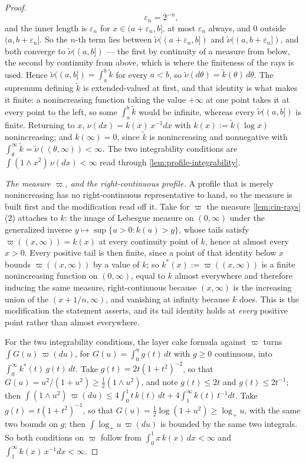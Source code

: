 \begin{proof}
\[  \qquad \varepsilon_n = 2^{-n},
\]
and the inner length is $\varepsilon_n$ for $x \in (a+\varepsilon_n, b]$, at most
$\varepsilon_n$ always, and $0$ outside $(a, b+\varepsilon_n]$. So the $n$-th term lies between
$\tilde\nu((a+\varepsilon_n, b])$ and $\tilde\nu((a, b+\varepsilon_n])$, and both converge to
$\tilde\nu((a,b])$ --- the first by continuity of a measure from below, the second by continuity
from above, which is where the finiteness of the rays is used. Hence
$\tilde\nu((a,b]) = \int_a^b \tilde k$ for every $a < b$, so $\tilde\nu(d\theta) =
\tilde k(\theta)\,d\theta$. The supremum defining $\tilde k$ is extended-valued at first, and
that identity is what makes it finite: a nonincreasing function taking the value $+\infty$ at
one point takes it at every point to the left, so some $\int_a^b \tilde k$ would be infinite,
whereas every $\tilde\nu((a,b])$ is finite. Returning to $x$, $\nu(dx) = k(x)\,x^{-1}dx$ with
$k(x) := \tilde k(\log x)$ nonincreasing; and $k(\infty) = 0$, since $\tilde k$ is nonincreasing
and nonnegative with $\int_\theta^\infty \tilde k = \tilde\nu((\theta,\infty)) < \infty$. The two
integrability
conditions are $\int (1 \wedge x^2)\,\nu(dx) < \infty$ read through
\ref{lem:profile-integrability}.

\emph{The measure $\varpi$, and the right-continuous profile.} A profile that is merely
nonincreasing has no right-continuous representative to hand, so the measure is built first and
the modification read off it. Take for $\varpi$ the measure \ref{lem:cin-rays}(2) attaches to
$k$: the image of Lebesgue measure on $(0,\infty)$ under the generalized inverse
$y \mapsto \sup\{u > 0 : k(u) > y\}$, whose tails satisfy $\varpi((x,\infty)) = k(x)$ at every
continuity point of $k$, hence at almost every $x > 0$. Every positive tail is then finite,
since a point of that identity below $x$ bounds $\varpi((x,\infty))$ by a value of $k$; so
$k^{\ast}(x) := \varpi((x,\infty))$ is a finite nonincreasing function on $(0,\infty)$, equal to
$k$ almost everywhere and therefore inducing the same \Levy{} measure, right-continuous because
$(x,\infty)$ is the increasing union of the $(x + 1/n,\infty)$, and vanishing at infinity
because $k$ does. This is the modification the statement asserts, and its tail identity holds at
\emph{every} positive point rather than almost everywhere.

For the two integrability conditions, the layer cake formula against $\varpi$ turns
$\int G(u)\,\varpi(du)$, for $G(u) = \int_0^u g(t)\,dt$ with $g \ge 0$ continuous, into
$\int_0^\infty k^{\ast}(t)\,g(t)\,dt$. Take $g(t) = 2t(1+t^2)^{-2}$, so that
$G(u) = u^2/(1+u^2) \ge \tfrac12 (1 \wedge u^2)$, and note $g(t) \le 2t$ and
$g(t) \le 2t^{-1}$; then
$\int (1 \wedge u^2)\,\varpi(du) \le 4\int_0^1 t\,k(t)\,dt + 4\int_1^\infty k(t)\,t^{-1}dt$.
Take $g(t) = t(1+t^2)^{-1}$, so that $G(u) = \tfrac12\log(1+u^2) \ge \log_+ u$, with the same
two bounds on $g$; then $\int \log_+ u\,\varpi(du)$ is bounded by the same two integrals. So
both conditions on $\varpi$ follow from $\int_0^1 x\,k(x)\,dx < \infty$ and
$\int_1^\infty k(x)\,x^{-1}dx < \infty$.


\end{proof}
